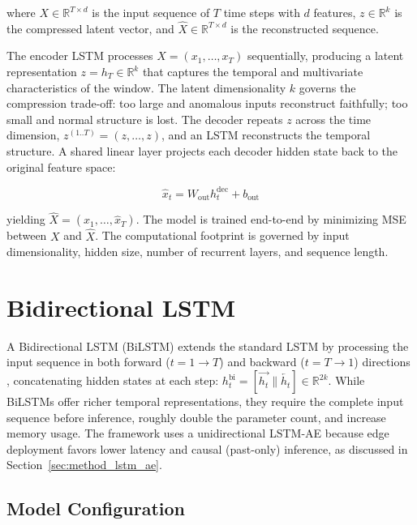 \noindent where $X \in \mathbb{R}^{T \times d}$ is the input sequence of $T$ time
steps with $d$ features, $z \in \mathbb{R}^{k}$ is the compressed latent vector, and
$\hat{X} \in \mathbb{R}^{T \times d}$ is the reconstructed sequence.

The encoder LSTM processes $X = (x_1, \ldots, x_T)$ sequentially, producing a
latent representation $z = h_T \in \mathbb{R}^{k}$ that captures the temporal
and multivariate characteristics of the window. The latent dimensionality $k$
governs the compression trade-off: too large and anomalous inputs reconstruct
faithfully; too small and normal structure is lost. The decoder repeats $z$
across the time dimension, $z^{(1..T)} = (z, \ldots, z)$, and an LSTM
reconstructs the temporal structure. A shared linear layer projects each
decoder hidden state back to the original feature space:

\begin{equation}
    \hat{x}_t = W_{\text{out}} h_t^{\text{dec}} + b_{\text{out}}
    \label{eq:linear_output}
\end{equation}

\noindent yielding $\hat{X} = (\hat{x}_1, \ldots, \hat{x}_T)$. The model is
trained end-to-end by minimizing MSE between $X$ and $\hat{X}$. The
computational footprint is governed by input dimensionality, hidden size,
number of recurrent layers, and sequence length.

\section{Bidirectional LSTM}
\label{sec:bilstm}

A Bidirectional LSTM (BiLSTM) extends the standard LSTM by processing the input
sequence in both forward ($t = 1 \rightarrow T$) and backward ($t = T \rightarrow 1$)
directions \cite{graves2005framewise, schuster1997bidirectional}, concatenating
hidden states at each step: $h_t^{\text{bi}} = [\overrightarrow{h_t} \| \overleftarrow{h_t}] \in \mathbb{R}^{2k}$.
While BiLSTMs offer richer temporal representations, they require the complete
input sequence before inference, roughly double the parameter count, and
increase memory usage. The framework uses a unidirectional LSTM-AE because edge
deployment favors lower latency and causal (past-only) inference, as discussed
in Section~\ref{sec:method_lstm_ae}.

\subsection{Model Configuration}
\label{subsec:model_config}

